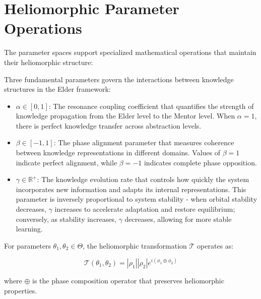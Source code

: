 \section{Heliomorphic Parameter Operations}

The parameter spaces support specialized mathematical operations that maintain their heliomorphic structure:

\begin{definition}
Three fundamental parameters govern the interactions between knowledge structures in the Elder framework:

\begin{itemize}
    \item $\alpha \in [0,1]$: The resonance coupling coefficient that quantifies the strength of knowledge propagation from the Elder level to the Mentor level. When $\alpha = 1$, there is perfect knowledge transfer across abstraction levels.
    
    \item $\beta \in [-1,1]$: The phase alignment parameter that measures coherence between knowledge representations in different domains. Values of $\beta = 1$ indicate perfect alignment, while $\beta = -1$ indicates complete phase opposition.
    
    \item $\gamma \in \mathbb{R}^+$: The knowledge evolution rate that controls how quickly the system incorporates new information and adapts its internal representations. This parameter is inversely proportional to system stability - when orbital stability decreases, $\gamma$ increases to accelerate adaptation and restore equilibrium; conversely, as stability increases, $\gamma$ decreases, allowing for more stable learning.
\end{itemize}
\end{definition}

\begin{theorem}
For parameters $\theta_1, \theta_2 \in \Theta$, the heliomorphic transformation $\mathcal{T}$ operates as:

\begin{equation}
\mathcal{T}(\theta_1, \theta_2) = |\rho_1||\rho_2|e^{i(\phi_1 \oplus \phi_2)}
\end{equation}

where $\oplus$ is the phase composition operator that preserves heliomorphic properties.
\end{theorem}

